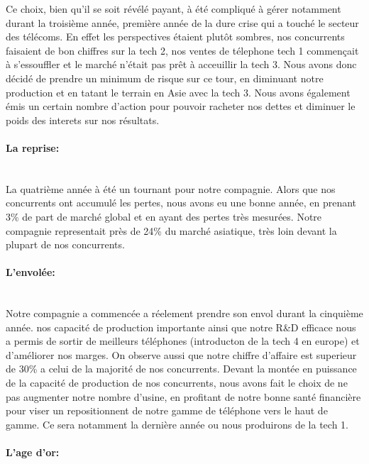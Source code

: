 Ce choix, bien qu'il se soit révélé payant, à été compliqué à gérer
notamment durant la troisième année, première année de la dure crise
qui a touché le secteur des télécoms. En effet les perspectives
étaient plutôt sombres, nos concurrents faisaient de bon chiffres sur
la tech 2, nos ventes de télephone tech 1 commençait à s'essouffler et
le marché n'était pas prêt à acceuillir la tech 3. Nous avons donc
décidé de prendre un minimum de risque sur ce tour, en diminuant notre
production et en tatant le terrain en Asie avec la tech 3. Nous avons
également émis un certain nombre d'action pour pouvoir racheter nos
dettes et diminuer le poids des interets sur nos résultats.

\paragraph{La reprise:}~\\

La quatrième année à été un tournant pour notre compagnie. Alors que nos
concurrents ont accumulé les pertes, nous avons eu une bonne année, en
prenant 3\% de part de marché global et en ayant des pertes très
mesurées. Notre compagnie representait près de 24\% du marché
asiatique, très loin devant la plupart de nos concurrents.

\paragraph{L'envolée:}~\\

Notre compagnie a commencée a réelement prendre son envol durant la
cinquième année. nos capacité de production importante ainsi que notre
R\&D efficace nous a permis de sortir de meilleurs téléphones
(introducton de la tech 4 en europe) et d'améliorer nos marges. On
observe aussi que notre chiffre d'affaire est superieur de 30\% a
celui de la majorité de nos concurrents. Devant la montée en puissance
de la capacité de production de nos concurrents, nous avons fait le
choix de ne pas augmenter notre nombre d'usine, en profitant de notre
bonne santé financière pour viser un repositionnent de notre gamme de
téléphone vers le haut de gamme. Ce sera notamment la dernière année
ou nous produirons de la tech 1.

\paragraph{L'age d'or:}~\\

